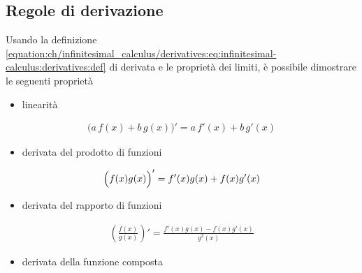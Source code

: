 \documentclass[letterpaper,10pt,english]{jupyterBook}
\begin{document}
\subsection{Regole di derivazione}
\label{\detokenize{ch/infinitesimal_calculus/derivatives:regole-di-derivazione}}\label{\detokenize{ch/infinitesimal_calculus/derivatives:infinitesimal-calculus-derivatives-rules}}
\sphinxAtStartPar
Usando la definizione \eqref{equation:ch/infinitesimal_calculus/derivatives:eq:infinitesimal-calculus:derivatives:def} di derivata e le proprietà dei limiti, è possibile dimostrare le seguenti proprietà
\begin{itemize}
\item {} 
\sphinxAtStartPar
linearità

\end{itemize}
\begin{equation}\label{equation:ch/infinitesimal_calculus/derivatives:infinitesimal-calculus:derivatives:rules:linearity}
\begin{split}\big( a \, f(x) + b \, g(x) \big)' = a \, f'(x) + b \, g'(x)\end{split}
\end{equation}\begin{itemize}
\item {} 
\sphinxAtStartPar
derivata del prodotto di funzioni

\end{itemize}
\begin{equation}\label{equation:ch/infinitesimal_calculus/derivatives:infinitesimal-calculus:derivatives:rules:product}
\begin{split}\Bigl( f(x) g(x) \Bigr)' = f'(x) g(x) + f(x) g'(x)\end{split}
\end{equation}\begin{itemize}
\item {} 
\sphinxAtStartPar
derivata del rapporto di funzioni

\end{itemize}
\begin{equation}\label{equation:ch/infinitesimal_calculus/derivatives:infinitesimal-calculus:derivatives:rules:division}
\begin{split}\left( \frac{f(x)}{g(x)} \right)' = \frac{f'(x) g(x) - f(x) g'(x)}{g^2(x)}\end{split}
\end{equation}\begin{itemize}
\item {} 
\sphinxAtStartPar
derivata della funzione composta

\end{itemize}
\end{document}
